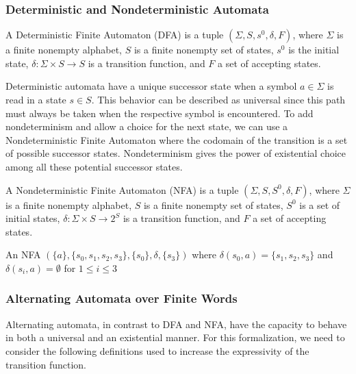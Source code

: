 \subsubsection{Deterministic and Nondeterministic Automata}


\begin{definition}
A Deterministic Finite Automaton (DFA) is a tuple $(\Sigma,S,s^0,\delta,F)$, where $\Sigma$ is a finite nonempty alphabet, $S$ is a finite nonempty set of states, $s^0$ is the initial state, $\delta : \Sigma \times S \to S$ is a transition function, and $F$ a set of accepting states. 
\end{definition}

Deterministic automata have a unique successor state when a symbol $a\in\Sigma$ is read in a state $s\in S$. This behavior can be described as universal since this path must always be taken when the respective symbol is encountered. To add nondeterminism and allow a choice for the next state, we can use a Nondeterministic Finite Automaton where the codomain of the transition is a set of possible successor states. Nondeterminism gives the power of existential choice among all these potential successor states. 

\begin{definition}
A Nondeterministic Finite Automaton (NFA) is a tuple $(\Sigma,S,S^0,\delta,F)$, where $\Sigma$ is a finite nonempty alphabet, $S$ is a finite nonempty set of states, $S^0$ is a set of initial states, $\delta : \Sigma \times S \to 2^S$ is a transition function, and $F$ a set of accepting states. 
\end{definition}

\begin{example}[NFA]
    An NFA $(\{a\},\{s_0,s_1,s_2,s_3\},\{s_0\},\delta,\{s_3\})$ where $\delta(s_0,a)=\{s_1,s_2,s_3\}$  and $\delta(s_i,a)=\emptyset$ for $1\leq i\leq 3$

    
\end{example}

\subsubsection{Alternating Automata over Finite Words}


Alternating automata, in contrast to DFA and NFA, have the capacity to behave in both a universal and an existential manner. For this formalization, we need to consider the following definitions used to increase the expressivity of the transition function.

